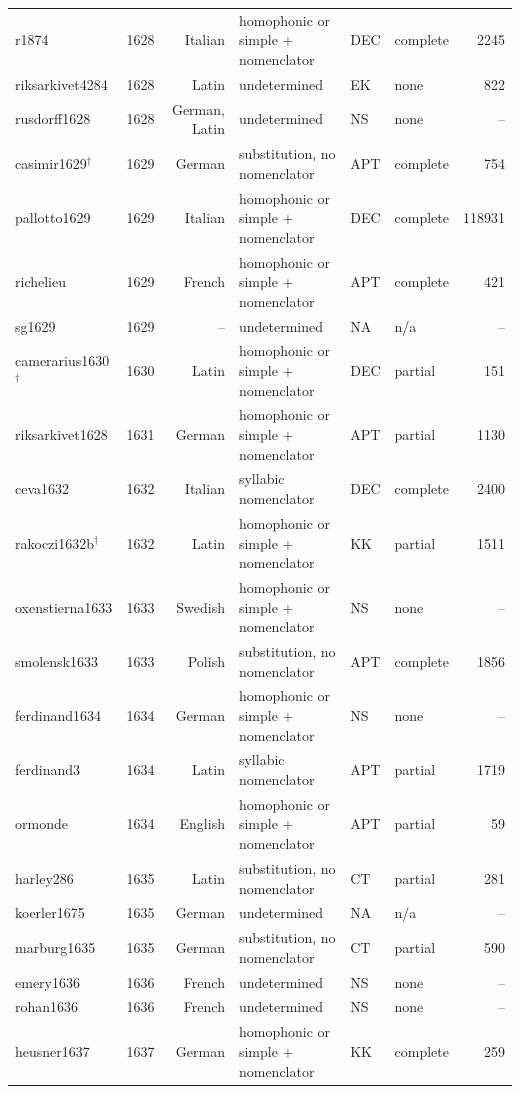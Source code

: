 {\begin{longtable}{@{}llrlllr@{}}
r1874 & 1628 & Italian & homophonic or simple + nomenclator & DEC & complete & 2245 \\
riksarkivet4284 & 1628 & Latin & undetermined & EK & none & 822 \\
rusdorff1628 & 1628 & German, Latin & undetermined & NS & none & -- \\
casimir1629$^\dagger$ & 1629 & German & substitution, no nomenclator & APT & complete & 754 \\
pallotto1629 & 1629 & Italian & homophonic or simple + nomenclator & DEC & complete & 118931 \\
richelieu & 1629 & French & homophonic or simple + nomenclator & APT & complete & 421 \\
sg1629 & 1629 & -- & undetermined & NA & n/a & -- \\
camerarius1630$^\dagger$ & 1630 & Latin & homophonic or simple + nomenclator & DEC & partial & 151 \\
riksarkivet1628 & 1631 & German & homophonic or simple + nomenclator & APT & partial & 1130 \\
ceva1632 & 1632 & Italian & syllabic nomenclator & DEC & complete & 2400 \\
rakoczi1632b$^\dagger$ & 1632 & Latin & homophonic or simple + nomenclator & KK & partial & 1511 \\
oxenstierna1633 & 1633 & Swedish & homophonic or simple + nomenclator & NS & none & -- \\
smolensk1633 & 1633 & Polish & substitution, no nomenclator & APT & complete & 1856 \\
ferdinand1634 & 1634 & German & homophonic or simple + nomenclator & NS & none & -- \\
ferdinand3 & 1634 & Latin & syllabic nomenclator & APT & partial & 1719 \\
ormonde & 1634 & English & homophonic or simple + nomenclator & APT & partial & 59 \\
harley286 & 1635 & Latin & substitution, no nomenclator & CT & partial & 281 \\
koerler1675 & 1635 & German & undetermined & NA & n/a & -- \\
marburg1635 & 1635 & German & substitution, no nomenclator & CT & partial & 590 \\
emery1636 & 1636 & French & undetermined & NS & none & -- \\
rohan1636 & 1636 & French & undetermined & NS & none & -- \\
heusner1637 & 1637 & German & homophonic or simple + nomenclator & KK & complete & 259 \\

\end{longtable}}
